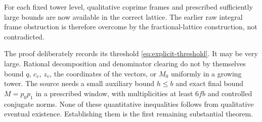 For each fixed tower level, qualitative coprime frames and prescribed sufficiently large bounds are now available in the correct lattice. The earlier raw integral frame obstruction is therefore overcome by the fractional-lattice construction, not contradicted.

The proof deliberately records its threshold \eqref{eq:explicit-threshold}. It may be very large. Rational decomposition and denominator clearing do not by themselves bound $q$, $c_v$, $z_v$, the coordinates of the vectors, or $M_0$ uniformly in a growing tower. The source needs a small auxiliary bound $h\le b$ and exact final bound $M=p_0p_1$ in a prescribed window, with multiplicities at least $6fb$ and controlled conjugate norms. None of these quantitative inequalities follows from qualitative eventual existence. Establishing them is the first remaining substantial theorem.

